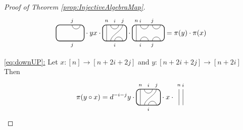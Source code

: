 \documentclass[11pt]{article}
\theoremstyle{plain}
\theoremstyle{definition}
\newcommand{\TLPlusPIso}[3]{
 \TLTStart
 \TLTThrough{#1}
 \TLTSnakeR{#2}{#3}
 \TLTEnd
}
\newcommand{\TLMinusPIso}[3]{
 \TLTStart
 \TLTThrough{#1}
 \TLTSnakeL{#2}{#3}
 \TLTEnd
}
\newcommand{\TLTCalcLabelOffset}[3][0cm]{
 \settowidth{#2}{\scriptsize{$#3$}}
 \setlength{#2}{.5#2}
 \setlength{#2}{\maxof{#2}{#1}}
}
\newcommand{\TLTEnd}{
 \draw[thick, rounded corners = 5pt] (0,0) rectangle ($ (TLTlead) + (0,.8) $);
 \end{tikzpicture}
}
\newcommand{\TLTStart}{
 \begin{tikzpicture}[baseline=.3cm]
 \coordinate (TLTlead) at (.2,0); %
 \let\TLTlabelwidth\relax
 \newlength{\TLTlabelwidth}
}
\newcommand{\TLTThrough}[1]{
 \TLTCalcLabelOffset[.2cm]{\TLTlabelwidth}{#1}
 \coordinate (TLTlead) at ($ (TLTlead) + ({\TLTlabelwidth},0) $);
 \begin{scope}[shift=(TLTlead)]
  \draw (0,0) -- (0,.8);
  \node at (0,1) {\scriptsize{$#1$}};
 \end{scope}
  \coordinate (TLTlead) at ($ (TLTlead) + ({\TLTlabelwidth},0) $);
}
\newcommand{\TLTCapcup}[1]{
 \TLTCalcLabelOffset[.2cm]{\TLTlabelwidth}{#1}
  \coordinate (TLTlead) at ($ (TLTlead) + ({\TLTlabelwidth},0) $);
 \begin{scope}[shift=(TLTlead)]
  \draw (0,0) arc (180:0:.2);
  \draw (0,.8) arc (-180:0:.2);
  \node at (0,1) {\scriptsize{$#1$}};
 \end{scope}
 \TLTCalcLabelOffset[.5cm]{\TLTlabelwidth}{#1}
 \coordinate (TLTlead) at ($ (TLTlead) + ({\TLTlabelwidth},0)$);
}
\newcommand{\TLTSnakeR}[2]{
 \let\TLTscwidth\relax
 \newlength{\TLTscwidth}
 \let\TLTsswidth\relax
 \newlength{\TLTsswidth}
 \TLTCalcLabelOffset[.2cm]{\TLTscwidth}{#1}
 \TLTCalcLabelOffset[.5cm]{\TLTsswidth}{#2}
 \setlength{\TLTlabelwidth}{\TLTscwidth+\TLTsswidth}
 \setlength{\TLTlabelwidth}{\maxof{\TLTlabelwidth}{.7cm}} %
 \coordinate (TLTlead) at ($ (TLTlead) + ({\TLTscwidth},0) $);
 \begin{scope}[shift=(TLTlead)]
  \draw (.1,.8) arc (-180:0:.2cm);
  \draw (.1,0) .. controls ++(90:.3cm) and ++(270:.3cm) .. ($ (.1,.8) + ({\TLTlabelwidth},0) $);
  \draw ($ (.1,0) + ({\TLTsswidth},0) $) arc (180:0:.2cm);
  \node at (.1,1) {\scriptsize{$#1$}};
  \node at ($ (.1,1) + ({\TLTlabelwidth},0) $) {\scriptsize{$#2$}};
  \node at ($ (.1,-.2) + ({\TLTsswidth},0) $) {\scriptsize{$#1$}};
 \end{scope}
 \coordinate (TLTlead) at ($ (TLTlead) + ({\TLTlabelwidth+\TLTsswidth},0) $);
}
\newcommand{\TLTSnakeL}[2]{
 \let\TLTscwidth\relax
 \newlength{\TLTscwidth}
 \let\TLTsswidth\relax
 \newlength{\TLTsswidth}
 \TLTCalcLabelOffset[.2cm]{\TLTscwidth}{#1}
 \TLTCalcLabelOffset[.1cm]{\TLTsswidth}{#2}
 \setlength{\TLTlabelwidth}{\TLTscwidth+\TLTsswidth}
 \setlength{\TLTlabelwidth}{\maxof{\TLTlabelwidth}{.5cm}} %
 \coordinate (TLTlead) at ($ (TLTlead) + ({\TLTsswidth},0) $);
 \begin{scope}[shift=(TLTlead)]
  \draw ($ (.1,.8) + ({\TLTsswidth+\TLTscwidth},0) $) arc (-180:0:.2cm);
  \draw ($ (.1,0) + ({\TLTlabelwidth},0) $) .. controls ++(90:.3cm) and ++(270:.3cm) .. (.1,.8);
  \draw (.1,0) arc (180:0:.2cm);
  \node at ($ (.1,1) + ({\TLTsswidth+\TLTscwidth},0) $) {\scriptsize{$#1$}};
  \node at (.1,1) {\scriptsize{$#2$}};
  \node at (.1,-.2) {\scriptsize{$#1$}};
 \end{scope}
 \setlength{\TLTscwidth}{\maxof{\TLTscwidth}{.5cm}} %
 \coordinate (TLTlead) at ($ (TLTlead) + ({\TLTlabelwidth+\TLTscwidth},0) $);
}
\begin{document}
\begin{proof}[Proof of Theorem \ref{prop:InjectiveAlgebraMap}]
$$\begin{tikzpicture}[baseline=.3cm]
  \node at (.8,-.2) {\scriptsize{$j$}};
  \draw (.8,.8) arc (-180:0:.2cm);
  \node at (.8,1) {\scriptsize{$j$}};
  \draw[thick, rounded corners = 5pt] (0,0) rectangle (1.4,.8);
 \end{tikzpicture}
\cdot yx \cdot 
 \begin{tikzpicture}[baseline=.3cm]
  \draw (.2,0) -- (.2,.8);
  \node at (.2,1) {\scriptsize{$n$}};
  \draw (.6,0) arc (180:0:.2cm);
  \node at (.6,-.2) {\scriptsize{$i$}};
  \draw (.4,0) .. controls ++(90:.3cm) and ++(270:.3cm) .. (1,.8);
  \node at (1,1) {\scriptsize{$j$}};
  \draw (.4,.8) arc (-180:0:.2cm);
  \node at (.6,1) {\scriptsize{$i$}};
  \draw[thick, rounded corners = 5pt] (0,0) rectangle (1.2,.8);
 \end{tikzpicture}
\cdot
 \begin{tikzpicture}[baseline=.3cm]
  \draw (.2,0) -- (.2,.8);
  \node at (.2,1) {\scriptsize{$n$}};
  \draw (.4,0) arc (180:0:.2cm);
  \node at (.4,-.2) {\scriptsize{$i$}};
  \draw (.4,.8) arc (-180:0:.2cm);
  \node at (.4,1) {\scriptsize{$i$}};
  \draw (1,0) arc (180:0:.2cm);
  \node at (1,-.2) {\scriptsize{$j$}};
  \draw (1,.8) arc (-180:0:.2cm);
  \node at (1,1) {\scriptsize{$j$}};
  \draw[thick, rounded corners = 5pt] (0,0) rectangle (1.6,.8);
 \end{tikzpicture} %
 = \pi(y) \cdot \pi(x)
$$
\item[\underline{\ref{eq:downUP}:}]
Let $x:[n]\rightarrow [n+2i+2j]$ and $y:[n+2i+2j]\rightarrow [n+2i]$
Then 
$$
 \pi(y\circ x) = d^{-i-j}y\cdot
 \begin{tikzpicture}[baseline=.3cm]
  \draw (.2,0) -- (.2,.8);
  \node at (.2,1) {\scriptsize{$n$}};
  \draw (.6,0) arc (180:0:.2cm);
  \node at (.6,-.2) {\scriptsize{$i$}};
  \draw (.4,0) .. controls ++(90:.3cm) and ++(270:.3cm) .. (1,.8);
  \node at (1,1) {\scriptsize{$j$}};
  \draw (.4,.8) arc (-180:0:.2cm);
  \node at (.6,1) {\scriptsize{$i$}};
  \draw[thick, rounded corners = 5pt] (0,0) rectangle (1.2,.8);
 \end{tikzpicture}
 \cdot x \cdot
 \begin{tikzpicture}[baseline=.3cm]
  \draw (.2,0) -- (.2,.8);
  \node at (.2,1) {\scriptsize{$n$}};
  \draw (.4,0) -- (.4,.8);
  \node at (.4,1) {\scriptsize{$i$}};

\end{tikzpicture}$$
\end{proof}
\end{document}
